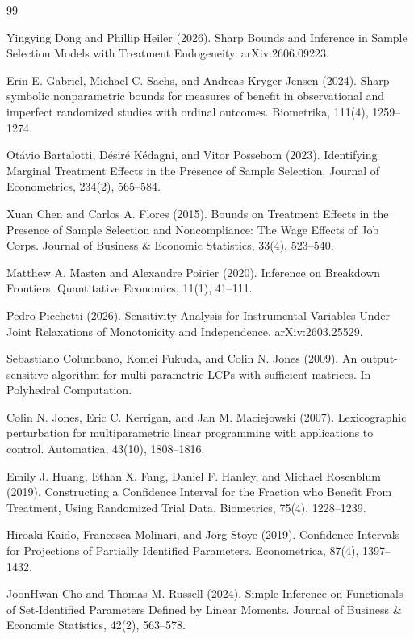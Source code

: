 \documentclass{article}
\begin{document}
\begin{thebibliography}{99}

   Yingying Dong and Phillip Heiler (2026). Sharp Bounds and Inference in Sample Selection Models with Treatment Endogeneity. arXiv:2606.09223.

   Erin E. Gabriel, Michael C. Sachs, and Andreas Kryger Jensen (2024). Sharp symbolic nonparametric bounds for measures of benefit in observational and imperfect randomized studies with ordinal outcomes. Biometrika, 111(4), 1259--1274.

   Otávio Bartalotti, Désiré Kédagni, and Vitor Possebom (2023). Identifying Marginal Treatment Effects in the Presence of Sample Selection. Journal of Econometrics, 234(2), 565--584.

   Xuan Chen and Carlos A. Flores (2015). Bounds on Treatment Effects in the Presence of Sample Selection and Noncompliance: The Wage Effects of Job Corps. Journal of Business \& Economic Statistics, 33(4), 523--540.

   Matthew A. Masten and Alexandre Poirier (2020). Inference on Breakdown Frontiers. Quantitative Economics, 11(1), 41--111.

   Pedro Picchetti (2026). Sensitivity Analysis for Instrumental Variables Under Joint Relaxations of Monotonicity and Independence. arXiv:2603.25529.

   Sebastiano Columbano, Komei Fukuda, and Colin N. Jones (2009). An output-sensitive algorithm for multi-parametric LCPs with sufficient matrices. In Polyhedral Computation.

   Colin N. Jones, Eric C. Kerrigan, and Jan M. Maciejowski (2007). Lexicographic perturbation for multiparametric linear programming with applications to control. Automatica, 43(10), 1808--1816.

   Emily J. Huang, Ethan X. Fang, Daniel F. Hanley, and Michael Rosenblum (2019). Constructing a Confidence Interval for the Fraction who Benefit From Treatment, Using Randomized Trial Data. Biometrics, 75(4), 1228--1239.

   Hiroaki Kaido, Francesca Molinari, and Jörg Stoye (2019). Confidence Intervals for Projections of Partially Identified Parameters. Econometrica, 87(4), 1397--1432.

   JoonHwan Cho and Thomas M. Russell (2024). Simple Inference on Functionals of Set-Identified Parameters Defined by Linear Moments. Journal of Business \& Economic Statistics, 42(2), 563--578.

\end{thebibliography}
\end{document}
